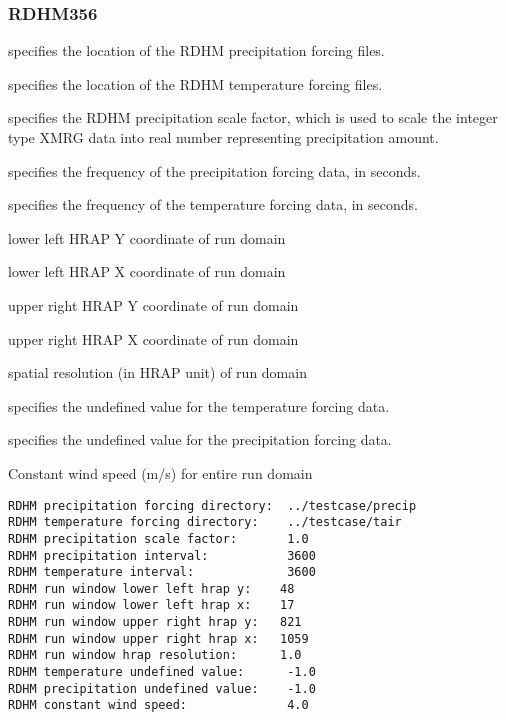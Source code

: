  
 \subsubsection{RDHM356} \label{sssec:rdhm356forcing}
 

 
  specifies the location
 of the RDHM precipitation forcing files.

  specifies the location
 of the RDHM temperature forcing files.

  specifies the RDHM
 precipitation scale factor, which is used to scale the integer 
 type XMRG data into real number representing precipitation amount. 

  specifies the frequency of
 the precipitation forcing data, in seconds.

  specifies the frequency of the
 temperature forcing data, in seconds.

  lower left HRAP Y coordinate of run domain

  lower left HRAP X coordinate of run domain

  upper right HRAP Y coordinate of run domain

  upper right HRAP X coordinate of run domain 

  spatial resolution (in HRAP unit) of run domain 

  specifies the undefined
 value for the temperature forcing data.

  specifies the
 undefined value for the precipitation forcing data.

  Constant wind speed (m/s) for entire run domain  
 

 \begin{Verbatim}[frame=single]
RDHM precipitation forcing directory:  ../testcase/precip
RDHM temperature forcing directory:    ../testcase/tair
RDHM precipitation scale factor:       1.0
RDHM precipitation interval:           3600
RDHM temperature interval:             3600
RDHM run window lower left hrap y:    48
RDHM run window lower left hrap x:    17
RDHM run window upper right hrap y:   821
RDHM run window upper right hrap x:   1059
RDHM run window hrap resolution:      1.0
RDHM temperature undefined value:      -1.0
RDHM precipitation undefined value:    -1.0
RDHM constant wind speed:              4.0
 \end{Verbatim}


